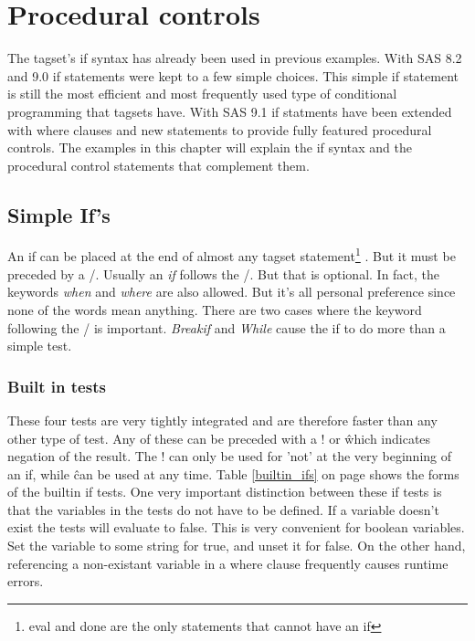 \chapter{Procedural controls}
The tagset's if syntax has already been used in previous examples. 
With SAS 8.2 and 9.0 if statements were kept to a few simple 
choices.  This simple if statement is still the most efficient
and most frequently used type of conditional programming that
tagsets have.  With SAS 9.1 if statments have been extended with
where clauses and new statements to provide fully featured procedural
controls.  
The examples in this chapter will explain the if syntax and the procedural control
statements that complement them.

\section{Simple If's}
\index{/}
An if can be
placed at the end of almost any tagset statement\footnote{eval and done are 
the only statements that cannot have an if}
.  But it must
be preceded by a /.  Usually an {\itshape if} follows the /.  But that is optional.
In fact, the keywords {\itshape when} and {\itshape where} are also allowed.  But it's
all personal preference since none of the words mean anything.  There
are two cases where the keyword following the / is important. 
{\itshape Breakif} and {\itshape While} cause the if to do more than a simple test.

\subsection{Built in tests}
These four tests
are very tightly integrated and are therefore faster than any other
type of test.  Any of these can be preceded with
a ! or \^ which indicates negation of the result.  The ! can only be
used for 'not' at the very beginning of an if, while \^ can be used
at any time.  Table \ref{builtin_ifs} on page \pageref{builtin_ifs}
shows the forms of the builtin if tests.  One very important distinction
between these if tests is that the variables in the tests do not have
to be defined.  If a variable doesn't exist the tests will evaluate to
false.  This is very convenient for boolean variables.  Set the variable
to some string for true, and unset it for false.  On the other hand,
referencing a non-existant variable in a where clause frequently
causes runtime errors.

